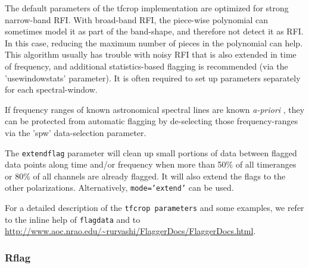 %
%                     


The default parameters of the tfcrop implementation are optimized for
strong narrow-band RFI. With broad-band RFI, the piece-wise polynomial
can sometimes model it as part of the band-shape, and therefore not
detect it as RFI. In this case, reducing the maximum number of pieces
in the polynomial can help. This algorithm usually has trouble with
noisy RFI that is also extended in time of frequency, and additional
statistics-based flagging is recommended (via the 'usewindowstats'
parameter). It is often required to set up parameters separately for
each spectral-window.

If frequency ranges of known astronomical spectral lines are known {\it 
a-priori} , they can be protected from automatic flagging by
de-selecting those frequency-ranges via the 'spw' data-selection
parameter.

The {\tt extendflag} parameter will clean up small portions of data
between flagged data points along time and/or frequency when more than
50\% of all timeranges or 80\% of all channels are already flagged. It
will also extend the flags to the other polarizations. Alternatively,
{\tt mode='extend'} can be used.

For a detailed description of the {\tt tfcrop parameters} and some
examples, we refer to the inline help of {\tt flagdata} and to
\url{http://www.aoc.nrao.edu/~rurvashi/FlaggerDocs/FlaggerDocs.html}.

\subsubsection{Rflag}
\label{section:edit.flagdata.mode.rflag}

